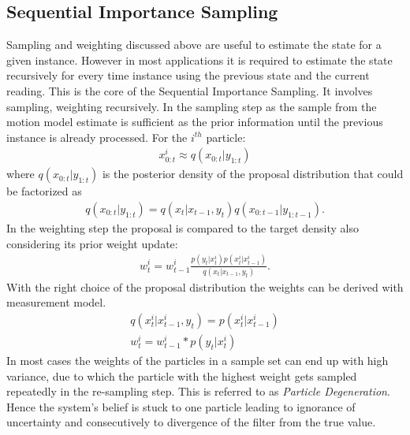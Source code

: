 \subsection{Sequential Importance Sampling}
Sampling and weighting discussed above are useful to estimate the state for a given instance. However in most applications it is required to estimate the state recursively for every time instance using the previous state and the current reading. This is the core of the Sequential Importance Sampling. It involves sampling, weighting recursively. In the sampling step as the sample from the motion model estimate is sufficient as the prior information until the previous instance is already processed.
For the ${i}^{th}$ particle:
\begin{gather} \label{SIS_Sample}
    x_{0:t}^{i} \approx q(x_{0:t}| y_{1:t}) 
\end{gather}
where ${q(x_{0:t}| y_{1:t})}$ is the posterior density of the proposal distribution that could be factorized as 
\begin{gather} \label{SIS_propfact}
    q(x_{0:t}| y_{1:t}) = q(x_t|x_{t-1},y_{t}) q(x_{0:t-1}| y_{1:t-1}).
\end{gather}
In the weighting step the proposal is compared to the target density also considering its prior weight update:
\begin{gather} \label{SIS_weight}
    w_{t}^{i} = w_{t-1}^{i} \frac{p(y_{t}|x_{t}^{i}) p(x_{t}^{i}|x_{t-1}^{i})}{q(x_t|x_{t-1},y_{t})}.
\end{gather}
With the right choice of the proposal distribution the weights can be derived with measurement model.
\begin{gather} \label{SIS_weightprop}
    q(x^i_t|x^i_{t-1},y_{t}) = p(x^i_t|x^i_{t-1})\\
    w_{t}^{i} = w_{t-1}^{i} * p(y_{t}|x_{t}^{i})
\end{gather}
In most cases the weights of the particles in a sample set can end up with high variance, due to which the particle with the highest weight gets sampled repeatedly in the re-sampling step. This is referred to as \textit{Particle Degeneration}. Hence the system's belief is stuck to one particle leading to ignorance of uncertainty and consecutively to divergence of the filter from the true value.


